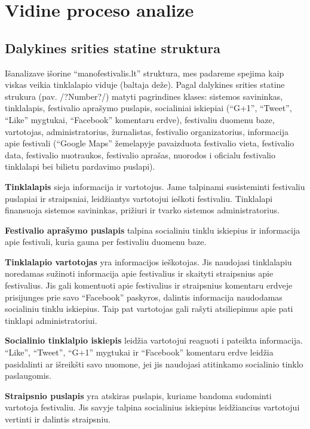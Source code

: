 ﻿\documentclass{VUMIFPSkursinis}
\begin{document}
{{\section{Vidine proceso analize}
\subsection {Dalykines srities statine struktura}
Išanalizave išorine “manofestivalis.lt” struktura, mes padareme spejima kaip viskas veikia tinklalapio viduje (baltaja deže).
Pagal dalykines srities statine strukura (pav. /?Number?/) matyti pagrindines klases: sistemos savininkas, tinklalapis, festivalio aprašymo puslapis,
 socialiniai iskiepiai (“G+1”, “Tweet”, “Like” mygtukai, “Facebook” komentaru erdve), festivaliu duomenu baze, vartotojas, administratorius, žurnalistas, festivalio organizatorius,
 informacija apie festivali (“Google Maps” žemelapyje pavaizduota festivalio vieta, festivalio data, festivalio nuotraukos, festivalio aprašas, nuorodos i oficialu festivalio tinklalapi bei bilietu pardavimo puslapi). 

\textbf{Tinklalapis} sieja informacija ir vartotojus. Jame talpinami susisteminti festivaliu puslapiai ir straipsniai, leidžiantys vartotojui ieškoti festivaliu. Tinklalapi finansuoja sistemos savininkas, prižiuri ir tvarko sistemos administratorius.

\textbf{Festivalio aprašymo puslapis} talpina socialiniu tinklu iskiepius ir informacija apie festivali, kuria gauna per festivaliu duomenu baze.  

\textbf{Tinklalapio vartotojas} yra informacijos ieškotojas. Jis naudojasi tinklalapiu noredamas sužinoti informacija apie festivalius ir skaityti straipsnius apie festivalius. Jis gali komentuoti apie festivalius ir straipsnius komentaru erdveje prisijunges prie savo “Facebook” paskyros, dalintis informacija naudodamas socialiniu tinklu iskiepius. Taip pat vartotojas gali rašyti atsiliepimus apie pati tinklapi administratoriui.

\textbf{Socialinio tinklalpio iskiepis} leidžia vartotojui reaguoti i pateikta informacija. “Like”, “Tweet”, “G+1” mygtukai  ir “Facebook” komentaru erdve leidžia pasidalinti ar išreikšti savo nuomone, jei jis naudojasi atitinkamo socialinio tinklo paslaugomis.

\textbf{Straipsnio puslapis} yra atskiras puslapis, kuriame bandoma sudominti vartotoja festivaliu. Jis savyje talpina socialinius iskiepius leidžiancius vartotojui vertinti ir dalintis straipsniu.

}}
\end{document}
